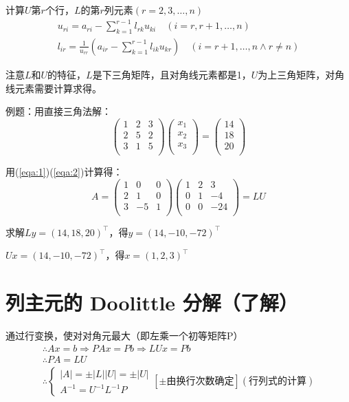 \documentclass[UTF8,a4paper,11pt,oneside]{ctexbook}
\begin{document}
计算\(U\)第\(r\)个行，\(L\)的第\(r\)列元素\((r=2,3,\ldots,n)\)
\begin{gather}
u_{ri}=a_{ri}-\sum_{k=1}^{r-1}l_{rk}u_{ki}\quad(i=r,r+1,\ldots,n)\label{eqa:1}\\
l_{ir}=\frac{1}{u_{rr}}\left(a_{ir}-\sum_{k=1}^{r-1}l_{ik}u_{kr}\right)\quad(i=r+1,\ldots,n\wedge r\neq n)\label{eqa:2}
\end{gather}

注意\(L\)和\(U\)的特征，\(L\)是下三角矩阵，且对角线元素都是1，\(U\)为上三角矩阵，对角线元素需要计算求得。

例题：用直接三角法解：
\[
\begin{pmatrix}
    1 & 2 & 3\\
    2 & 5 & 2\\
    3 & 1 & 5\\
\end{pmatrix}
\begin{pmatrix}
    x_1\\
    x_2\\
    x_3\\
\end{pmatrix}
=
\begin{pmatrix}
    14\\
    18\\
    20\\
\end{pmatrix}
\]

用(\ref{eqa:1})(\ref{eqa:2})计算得：
\[
A=\begin{pmatrix}
    1 & 0 & 0\\
    2 & 1 & 0\\
    3 & -5 & 1\\
\end{pmatrix}
\begin{pmatrix}
    1 & 2 & 3\\
    0 & 1 & -4\\
    0 & 0 & -24\\
\end{pmatrix}
=LU
\]

求解\(Ly=(14,18,20)^\top\)，得\(y=(14,-10,-72)^\top\)

\(Ux=(14,-10,-72)^\top\)，得\(x=(1,2,3)^\top\)

\section{列主元的 Doolittle 分解（了解）}

通过行变换，使对对角元最大（即左乘一个初等矩阵P）
\[
\begin{array}{l}
    \therefore Ax=b\Rightarrow PAx=Pb\Rightarrow LUx=Pb\\
    \therefore PA=LU\\
    \therefore \begin{cases}
        |A|=\pm|L||U|=\pm|U|\\
        A^{-1}=U^{-1}L^{-1}P
    \end{cases}[\pm\text{由换行次数确定}](\text{行列式的计算})
\end{array}
\]
\end{document}
